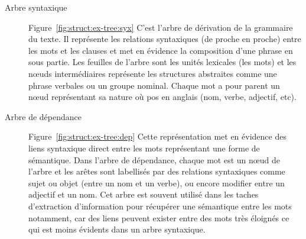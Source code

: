 \begin{description}
    \item[Arbre syntaxique]
          Figure~\ref{fig:struct:ex-tree:syx}
          C'est l'arbre de dérivation de la grammaire du texte.
          Il représente les relations syntaxiques (de proche en proche) entre les mots et les clauses et met en évidence la composition d'une phrase en sous partie.
          Les feuilles de l'arbre sont les unités lexicales (les mots) et les nœuds intermédiaires représente les structures abstraites comme une phrase verbales ou un groupe nominal.
          Chaque mot a pour parent un nœud représentant sa nature où \gls{pos} en anglais (nom, verbe, adjectif, etc).

    \item[Arbre de dépendance]
          Figure~\ref{fig:struct:ex-tree:dep}
          Cette représentation met en évidence des liens syntaxique direct entre les mots représentant une forme de sémantique.
          Dans l'arbre de dépendance, chaque mot est un nœud de l'arbre et les arêtes sont labellisés par des relations syntaxiques comme sujet ou objet (entre un nom et un verbe), ou encore modifier entre un adjectif et un nom.
          Cet arbre est souvent utilisé dans les taches d'extraction d'information pour récupérer une sémantique entre les mots notamment, car des liens peuvent exister entre des mots très éloignés ce qui est moins évidents dans un arbre syntaxique.
\end{description}

